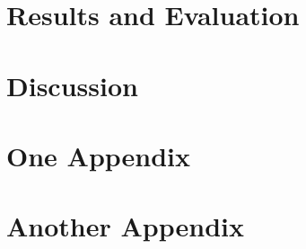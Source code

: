 \documentclass[12pt,a4paper]{report}
\begin{document}
\chapter{Results and Evaluation}

\chapter{Discussion}

\begin{thebibliography}{00}

\end{thebibliography}

\newpage

\begin{appendices}
\chapter{One Appendix}
\chapter{Another Appendix}
\end{appendices}
\end{document}
